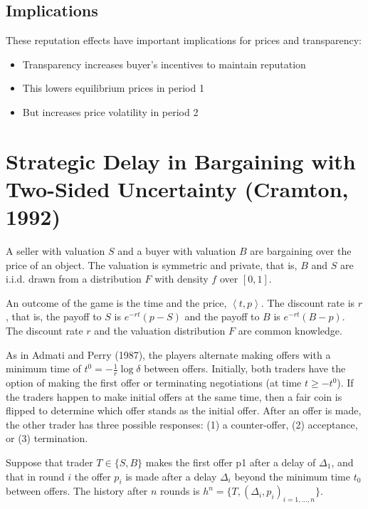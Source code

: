 \documentclass[11pt]{elegantbook_2}
\begin{document}
\subsection{Implications}
These reputation effects have important implications for prices and transparency:
\begin{itemize}
    \item Transparency increases buyer's incentives to maintain reputation
    \item This lowers equilibrium prices in period 1
    \item But increases price volatility in period 2
\end{itemize}





















\section{Strategic Delay in Bargaining with Two-Sided Uncertainty (Cramton, 1992)}
A seller with valuation $S$ and a buyer with valuation $B$ are bargaining over the price of an object. The valuation is symmetric and private, that is, $B$ and $S$ are i.i.d. drawn from a distribution $F$ with density $f$ over $[0,1]$.

An outcome of the game is the time and the price, $\left<t,p\right>$. The discount rate is $r$, that is, the payoff to $S$ is $e^{-rt}(p-S)$ and the payoff to $B$ is $e^{-rt}(B-p)$. The discount rate $r$ and the valuation distribution $F$ are common knowledge.

As in Admati and Perry (1987), the players alternate making offers with a minimum time of $t^0=-\frac{1}{r}\log\delta$ between offers. Initially, both traders have the option of making the first offer or terminating negotiations (at time $t\geq-t^0$). If the traders happen to make initial offers at the same time, then a fair coin is flipped to determine which offer stands as the initial offer. After an offer is made, the other trader has three possible responses: (1) a counter-offer, (2) acceptance, or (3) termination.

Suppose that trader $T\in\{S,B\}$ makes the first offer p1 after a delay of $\Delta_1$, and that in round $i$ the offer $p_i$ is made after a delay $\Delta_i$ beyond the minimum time $t_0$ between offers. The history after $n$ rounds is $h^n=\{T,(\Delta_i,p_i)_{i=1,...,n}\}$.
\end{document}
